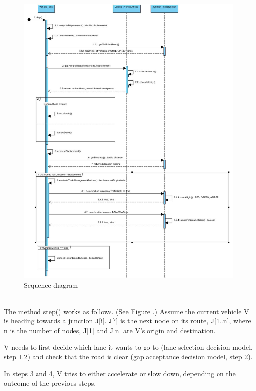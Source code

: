 \documentclass[11pt]{article}
\begin{document}
\begin{figure}
\begin{center}
\includegraphics[scale=0.45]{step_method_seq_diagram}
\caption{Sequence diagram}
\end{center}
\end{figure}

\\
The method step() works as follows. (See Figure .) Assume the current vehicle V is heading towards a junction J[i]. J[i] is the next node on its route, J[1..n], where n is the number of nodes, J[1] and J[n] are V\textquoteright s origin and destination. 

V needs to first decide which lane it wants to go to (lane selection decision model, step 1.2) and check that the road is clear (gap acceptance decision model, step 2). 

In steps 3 and 4, V tries to either accelerate or slow down, depending on the outcome of the previous steps. 
\end{document}
